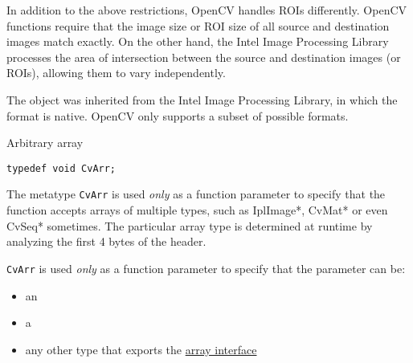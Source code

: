 In addition to the above restrictions, OpenCV handles ROIs differently. OpenCV functions require that the image size or ROI size of all source and destination images match exactly. On the other hand, the Intel Image Processing Library processes the area of intersection between the source and destination images (or ROIs), allowing them to vary independently. 
\fi

\ifPy

The  object was inherited from the Intel Image Processing
Library, in which the format is native. OpenCV only supports a subset
of possible  formats.

\begin{description}
\end{description}
\fi

\label{CvArr}
Arbitrary array

\ifC
\begin{lstlisting}
typedef void CvArr;
\end{lstlisting}

The metatype \texttt{CvArr} is used \textit{only} as a function parameter to specify that the function accepts arrays of multiple types, such as IplImage*, CvMat* or even CvSeq* sometimes. The particular array type is determined at runtime by analyzing the first 4 bytes of the header.
\fi

\ifPy
\texttt{CvArr} is used \textit{only} as a function parameter to specify that the parameter can be:
\begin{itemize}
\item{an }
\item{a }
\item{any other type that exports the \href{http://docs.scipy.org/doc/numpy/reference/arrays.interface.html}{array interface}}
\end{itemize}
\fi

